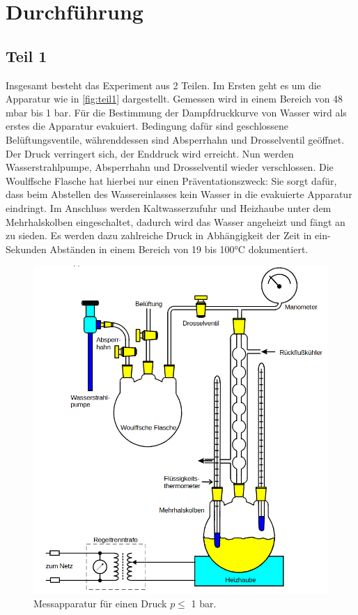 \section{Durchführung}
\label{sec:Durchführung}

\subsection{Teil 1}
Insgesamt besteht das Experiment aus 2 Teilen. Im Ersten geht es um die 
Apparatur wie in \autoref{fig:teil1} dargestellt. Gemessen wird in einem 
Bereich von 48 mbar bis 1 bar. Für die Bestimmung der Dampfdruckkurve von 
Wasser wird als erstes die Apparatur evakuiert. Bedingung dafür sind 
geschlossene Belüftungsventile, währenddessen sind Absperrhahn und Drosselventil 
geöffnet. Der Druck verringert sich, der Enddruck wird erreicht. Nun werden 
Wasserstrahlpumpe, Absperrhahn und Drosselventil wieder verschlossen. Die 
Woulffsche Flasche hat hierbei nur einen Präventationszweck: Sie sorgt dafür, 
dass beim Abstellen des Wassereinlasses kein Wasser in die evakuierte Apparatur 
eindringt. Im Anschluss werden Kaltwasserzufuhr und Heizhaube unter dem 
Mehrhalskolben eingeschaltet, dadurch wird das Wasser angeheizt und fängt an 
zu sieden. Es werden dazu zahlreiche Druck in Abhängigkeit der Zeit in ein-Sekunden 
Abständen in einem Bereich von 19 bis 100°C dokumentiert.
\begin{figure}[h!]
    \centering
        \centering
        \includegraphics[width=\textwidth]{Bilder/teil1.png}
        \caption{Messapparatur für einen Druck $p \leq$ 1 bar. \cite{teil1}}
    \hfill
    \label{fig:teil1}
\end{figure}
